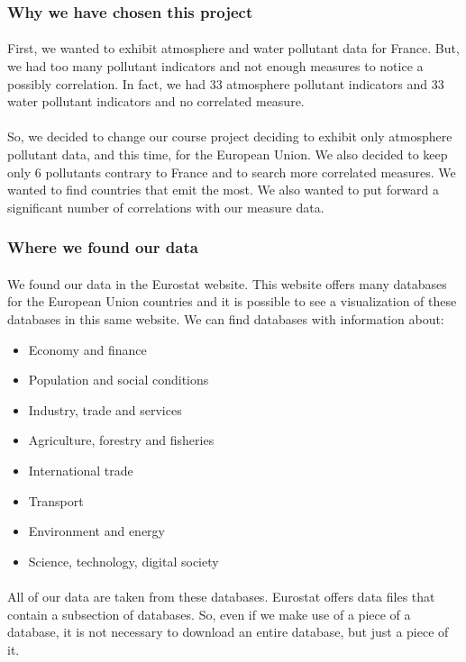 \documentclass[preprint,journal]{vgtc}       %
\begin{document}
		\subsubsection{Why we have chosen this project}
		\paragraph{}
First, we wanted to exhibit atmosphere and water pollutant data for France. But, we had too many pollutant indicators and not enough measures to notice a possibly correlation. In fact, we had  33 atmosphere pollutant indicators and 33 water pollutant indicators and no correlated measure.		
		\paragraph{}
So, we decided to change our course project deciding to exhibit only atmosphere pollutant data, and this time, for the European Union. We also decided to keep only 6 pollutants contrary to France and to search more correlated measures. We wanted to find countries that emit the most. We also wanted to put forward a significant number of correlations with our measure data.		
		\subsubsection{Where we found our data}
		\paragraph{}
We found our data in the Eurostat website. This website offers many databases for the European Union countries and it is possible to see a visualization of these databases in this same website. We can find databases with information about:
\begin{itemize}[parsep=0cm,itemsep=0cm]
\item Economy and finance
\item Population and social conditions
\item Industry, trade and services
\item Agriculture, forestry and fisheries
\item International trade
\item Transport
\item Environment and energy
\item Science, technology, digital society
\end{itemize}
\paragraph{}
All of our data are taken from these databases. Eurostat offers data files that contain a subsection of databases. So, even if we make use of a piece of a database, it is not necessary to download an entire database, but just a piece of it.
\end{document}
